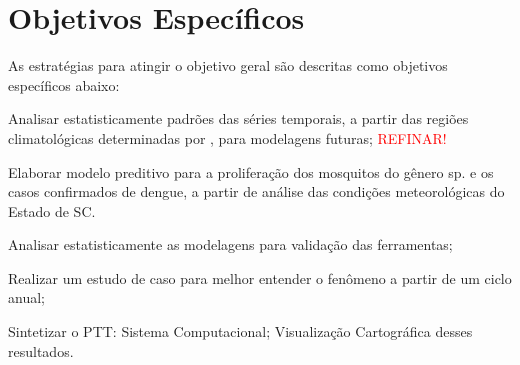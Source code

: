 

 
\section{Objetivos Específicos}
As estratégias para atingir o objetivo geral são descritas como objetivos específicos abaixo:

\begin{alineas}
\item Analisar estatisticamente padrões das séries temporais, a partir das regiões climatológicas determinadas por , para modelagens futuras; \textcolor{red}{REFINAR!}
\item Elaborar modelo preditivo para a proliferação dos mosquitos do gênero  sp. e os casos confirmados de dengue, a partir de análise das condições meteorológicas do Estado de \acrlong{SC}.
\item Analisar estatisticamente as modelagens para validação das ferramentas;
\item Realizar um estudo de caso para melhor entender o fenômeno a partir de um ciclo anual;
\item Sintetizar o \acrfull{PTT}:
\subitem Sistema Computacional;
\subitem Visualização Cartográfica desses resultados.
\end{alineas}
